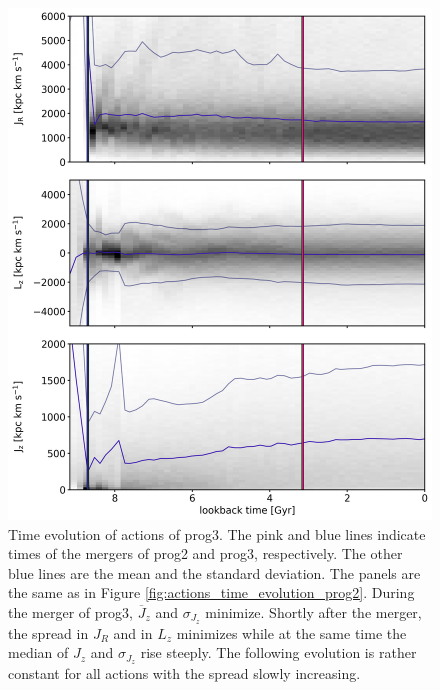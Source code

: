 \begin{figure}
\captionsetup{format=plain}
    \centering
	\includegraphics[width=\textwidth]{plots/Dynamics/prog3/action_time_evolution_wodisk_hist_mean.png}
    \caption{Time evolution of actions of prog3. The pink and blue lines indicate times of the mergers of prog2 and prog3, respectively. The other blue lines are the mean and the standard deviation. The panels are the same as in Figure \ref{fig:actions_time_evolution_prog2}. During the merger of prog3, $\overline{J}_z$ and $\sigma{_J_z}$ minimize. Shortly after the merger, the spread in $J_R$ and in $L_z$ minimizes while at the same time the median of $J_z$ and $\sigma{_J_z}$ rise steeply. The following evolution is rather constant for all actions with the spread slowly increasing.}\label{fig:actions_time_evolution_prog3}
\end{figure}

